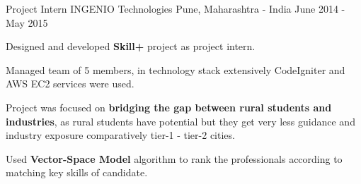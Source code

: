 \begin{cventries}
  \cventry
    {Project Intern} %
    {INGENIO Technologies} %
    {Pune, Maharashtra - India} %
    {June 2014 - May 2015} %
    {
      \begin{cvitems} %
        \item {Designed and developed \textbf{Skill+} project as project intern.}
        \item {Managed team of 5 members, in technology stack extensively CodeIgniter and AWS EC2 services were used.}
        \item {Project was focused on \textbf{bridging the gap between rural students and industries}, as rural students have potential but they get very less guidance and industry exposure comparatively tier-1 - tier-2 cities.}
        \item {Used \textbf{Vector-Space Model} algorithm to rank the professionals according to matching key skills of candidate.}
      \end{cvitems}
    }

\end{cventries}
